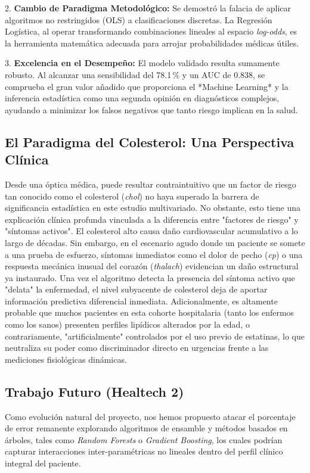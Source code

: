 \documentclass[twocolumn,10pt]{article}
\begin{document}
2. \textbf{Cambio de Paradigma Metodológico:} Se demostró la falacia de aplicar algoritmos no restringidos (OLS) a clasificaciones discretas. La Regresión Logística, al operar transformando combinaciones lineales al espacio \textit{log-odds}, es la herramienta matemática adecuada para arrojar probabilidades médicas útiles.

3. \textbf{Excelencia en el Desempeño:} El modelo validado resulta sumamente robusto. Al alcanzar una sensibilidad del 78.1\,\% y un AUC de 0.838, se comprueba el gran valor añadido que proporciona el *Machine Learning* y la inferencia estadística como una segunda opinión en diagnósticos complejos, ayudando a minimizar los falsos negativos que tanto riesgo implican en la salud.

\subsection{El Paradigma del Colesterol: Una Perspectiva Clínica}

Desde una óptica médica, puede resultar contraintuitivo que un factor de riesgo tan conocido como el colesterol (\textit{chol}) no haya superado la barrera de significancia estadística en este estudio multivariado. No obstante, esto tiene una explicación clínica profunda vinculada a la diferencia entre "factores de riesgo" y "síntomas activos". El colesterol alto causa daño cardiovascular acumulativo a lo largo de décadas. Sin embargo, en el escenario agudo donde un paciente se somete a una prueba de esfuerzo, síntomas inmediatos como el dolor de pecho (\textit{cp}) o una respuesta mecánica inusual del corazón (\textit{thalach}) evidencian un daño estructural ya instaurado. Una vez el algoritmo detecta la presencia del síntoma activo que "delata" la enfermedad, el nivel subyacente de colesterol deja de aportar información predictiva diferencial inmediata. Adicionalmente, es altamente probable que muchos pacientes en esta cohorte hospitalaria (tanto los enfermos como los sanos) presenten perfiles lipídicos alterados por la edad, o contrariamente, "artificialmente" controlados por el uso previo de estatinas, lo que neutraliza su poder como discriminador directo en urgencias frente a las mediciones fisiológicas dinámicas.

\subsection{Trabajo Futuro (Healtech 2)}

Como evolución natural del proyecto, nos hemos propuesto atacar el porcentaje de error remanente explorando algoritmos de ensamble y métodos basados en árboles, tales como \textit{Random Forests} o \textit{Gradient Boosting}, los cuales podrían capturar interacciones inter-paramétricas no lineales dentro del perfil clínico integral del paciente.



\end{document}
